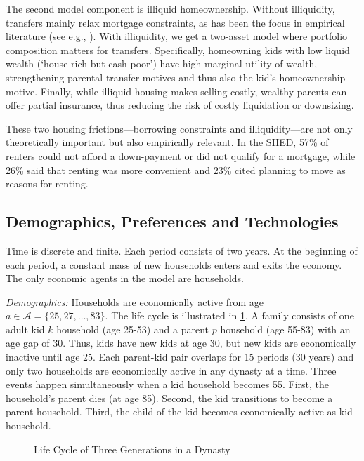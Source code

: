 \documentclass[12pt]{article}
\begin{document}
The second model component is illiquid homeownership. Without illiquidity, transfers mainly relax mortgage constraints, as has been the focus in empirical literature (see e.g., \cite{Blickle2019,Engelhardt1998,Guiso2002,Lee2018}). With illiquidity, we get a two-asset model where portfolio composition matters for transfers. Specifically, homeowning kids with low liquid wealth (`house-rich but cash-poor') have high marginal utility of wealth, strengthening parental transfer motives and thus also the kid's homeownership motive. Finally, while illiquid housing makes selling costly, wealthy parents can offer partial insurance, thus reducing the risk of costly liquidation or downsizing.

These two housing frictions---borrowing constraints and illiquidity---are not only theoretically important but also empirically relevant. In the SHED, 57\% of renters could not afford a down-payment or did not qualify for a mortgage, while 26\% said that renting was more convenient and 23\% cited planning to move as reasons for renting. 

\subsection{Demographics, Preferences and Technologies}
Time is discrete and finite. Each period consists of two years. At the beginning of each period, a constant mass of new households enters and exits the economy. The only economic agents in the model are households.

\textit{Demographics:} Households are economically active from age $a\in \mathcal{A}=\{25,\allowbreak 27,\allowbreak\dots,\allowbreak 83\}$. The life cycle is illustrated in \ref{fig:overview}. A family consists of one adult kid $k$ household (age 25-53) and a parent $p$ household (age 55-83) with an age gap of 30. Thus, kids have new kids at age 30, but new kids are economically inactive until age 25.  Each parent-kid pair overlaps for 15 periods (30 years) and only two households are economically active in any dynasty at a time. Three events happen simultaneously when a kid household becomes 55. First, the household's parent dies (at age 85). Second, the kid transitions to become a parent household. Third, the child of the kid becomes economically active as kid household.

\begin{figure}\begin{center}
	\caption{Life Cycle of Three Generations in a Dynasty }\label{fig:overview}
	
\end{center}
\end{figure} 
\end{document}
